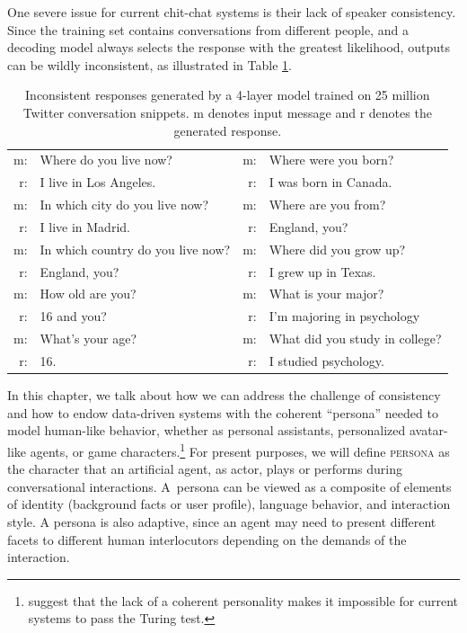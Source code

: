 One severe issue for current chit-chat systems is their lack of speaker consistency. 
Since the training set contains conversations from different people, and a decoding model always selects the response with the greatest likelihood,
outputs can be wildly inconsistent, as illustrated in Table \ref{sample:baseline}. 
\begin{table}
\center
\begin{tabular}{rlrl}\toprule
m: & Where do you live now?&m:  & Where were you born?\\
r: & I live in Los Angeles.&r: & I was born in Canada.  \\
m:  & In which city do you live now?& m:  & Where are you from?\\
r: & I live in Madrid.& r: & England, you?\\
m:  & In which country do you live now?&m:  & Where did you grow up?\\
r: & England, you?& r: & I grew up in Texas.\\\midrule
m:  & How old are you?&m:  & What is your major? \\
r: & 16 and you?& r:&I'm majoring in psychology \\
m:  & What's your age?&m:  & What did you study in college?\\
r: & 16. &r:& I studied psychology. \\\bottomrule
\end{tabular}
\caption[Inconsistent responses from \sts models]{Inconsistent responses generated by a 4-layer \sts model trained on 25 million Twitter conversation snippets. m denotes input message and r denotes the generated response.}
\label{sample:baseline}
\end{table}

In this chapter, we 
talk about how we can 
address the challenge of consistency and how to endow data-driven systems with the coherent ``persona'' needed to model human-like behavior, whether as personal assistants, personalized avatar-like agents, or game characters.\footnote{ suggest that the lack of a coherent personality makes it impossible for current systems to pass the Turing test.} 
For present purposes, we will define \textsc{persona} as the character that an artificial agent, as actor, plays or performs during conversational interactions.
A~persona can be viewed as a composite of elements of identity (background facts or user profile), language behavior, and interaction style. 
A persona is also adaptive, since an agent may need to present different facets to different human interlocutors depending on the demands of the interaction. 


